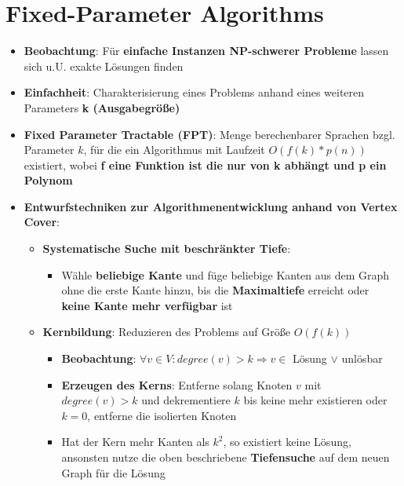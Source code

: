 \section{Fixed-Parameter Algorithms}%
\label{fpa:sec:fixed_parameter_algorithms}

\begin{itemize}
	\item \textbf{Beobachtung}: Für \textbf{einfache Instanzen NP-schwerer Probleme} lassen sich u.U. exakte Lösungen finden
	\item \textbf{Einfachheit}: Charakterisierung eines Problems anhand eines weiteren Parameters \textbf{k (Ausgabegröße)}
	\item \textbf{Fixed Parameter Tractable (FPT)}: Menge berechenbarer Sprachen bzgl. Parameter $k$, für die ein Algorithmus mit Laufzeit $O(f(k) * p(n))$ existiert, wobei \textbf{f eine Funktion ist die nur von k abhängt und p ein Polynom}
	\item \textbf{Entwurfstechniken zur Algorithmenentwicklung anhand von Vertex Cover}:
	\begin{itemize}
		\item \textbf{Systematische Suche mit beschränkter Tiefe}:
	 	\begin{itemize}
	 		\item Wähle \textbf{beliebige Kante} und füge beliebige Kanten aus dem Graph ohne die erste Kante hinzu, bis die \textbf{Maximaltiefe} erreicht oder \textbf{keine Kante mehr verfügbar} ist
	 	\end{itemize}
	 	\item \textbf{Kernbildung}: Reduzieren des Problems auf Größe $O(f(k))$
	 	\begin{itemize}
	 		\item \textbf{Beobachtung}: $\forall v \in V: degree(v) > k \Rightarrow v \in$ Lösung $\lor$ unlösbar
	 		\item \textbf{Erzeugen des Kerns}: Entferne solang Knoten $v$ mit $degree(v) > k$ und dekrementiere $k$ bis keine mehr existieren oder $k = 0$, entferne die isolierten Knoten
	 		\item Hat der Kern mehr Kanten als $k^2$, so existiert keine Lösung, ansonsten nutze die oben beschriebene \textbf{Tiefensuche} auf dem neuen Graph für die Lösung
	 	\end{itemize}
	 \end{itemize} 
\end{itemize}
